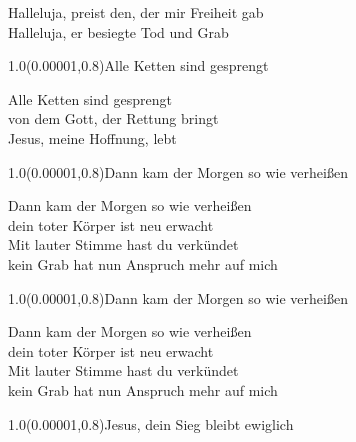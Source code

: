 \documentclass[aspectratio=169]{beamer}
\begin{document}
\begin{frame}
\centering
\color{white}
\huge{Halleluja, preist den, der mir Freiheit gab} \\
\huge{Halleluja, er besiegte Tod und Grab} \\

\begin{textblock}{1.0}(0.00001,0.8)\color{gray}\normalsize{Alle Ketten sind gesprengt}\end{textblock}
\end{frame}

\begin{frame}
\centering
\color{white}
\huge{Alle Ketten sind gesprengt} \\
\huge{von dem Gott, der Rettung bringt} \\
\huge{Jesus, meine Hoffnung, lebt} \\

\begin{textblock}{1.0}(0.00001,0.8)\color{gray}\normalsize{Dann kam der Morgen so wie verheißen}\end{textblock}
\end{frame}

\begin{frame}
\centering
\color{white}
\huge{Dann kam der Morgen so wie verheißen} \\
\huge{dein toter Körper ist neu erwacht} \\
\huge{Mit lauter Stimme hast du verkündet} \\
\huge{kein Grab hat nun Anspruch mehr auf mich} \\

\begin{textblock}{1.0}(0.00001,0.8)\color{gray}\normalsize{Dann kam der Morgen so wie verheißen}\end{textblock}
\end{frame}

\begin{frame}
\centering
\color{white}
\huge{Dann kam der Morgen so wie verheißen} \\
\huge{dein toter Körper ist neu erwacht} \\
\huge{Mit lauter Stimme hast du verkündet} \\
\huge{kein Grab hat nun Anspruch mehr auf mich} \\

\begin{textblock}{1.0}(0.00001,0.8)\color{gray}\normalsize{Jesus, dein Sieg bleibt ewiglich}\end{textblock}
\end{frame}
\end{document}

